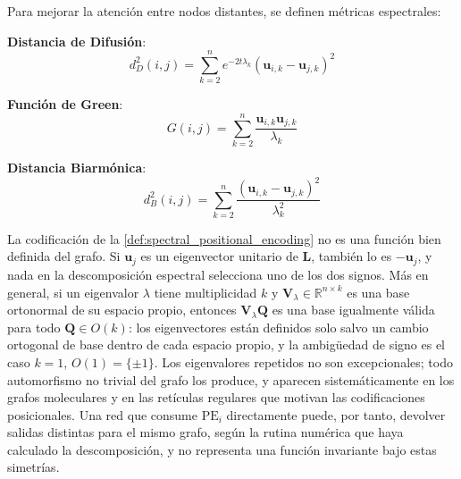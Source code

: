 \begin{definition}\label{def:spectral_distances_attention}
Para mejorar la atención entre nodos distantes, se definen métricas espectrales:

\textbf{Distancia de Difusión}:
\begin{equation}
    d_D^2(i,j) = \sum_{k=2}^{n} e^{-2t\lambda_k} (\mathbf{u}_{i,k} - \mathbf{u}_{j,k})^2
    \label{eq:diffusion_distance}
\end{equation}

\textbf{Función de Green}:
\begin{equation}
    G(i,j) = \sum_{k=2}^{n} \frac{\mathbf{u}_{i,k} \mathbf{u}_{j,k}}{\lambda_k}
    \label{eq:green_function_distance}
\end{equation}

\textbf{Distancia Biarmónica}:
\begin{equation}
    d_B^2(i,j) = \sum_{k=2}^{n} \frac{(\mathbf{u}_{i,k} - \mathbf{u}_{j,k})^2}{\lambda_k^2}
    \label{eq:biharmonic_distance}
\end{equation}
\end{definition}

\begin{remark}\label{rem:ambiguedad_autovectores}
La codificación de la \autoref{def:spectral_positional_encoding} no es una función bien definida del grafo. Si $\mathbf{u}_j$ es un eigenvector unitario de $\mathbf{L}$, también lo es $-\mathbf{u}_j$, y nada en la descomposición espectral selecciona uno de los dos signos. Más en general, si un eigenvalor $\lambda$ tiene multiplicidad $k$ y $\mathbf{V}_\lambda \in \mathbb{R}^{n \times k}$ es una base ortonormal de su espacio propio, entonces $\mathbf{V}_\lambda \mathbf{Q}$ es una base igualmente válida para todo $\mathbf{Q} \in O(k)$: los eigenvectores están definidos solo salvo un cambio ortogonal de base dentro de cada espacio propio, y la ambigüedad de signo es el caso $k = 1$, $O(1) = \{\pm 1\}$. Los eigenvalores repetidos no son excepcionales; todo automorfismo no trivial del grafo los produce, y aparecen sistemáticamente en los grafos moleculares y en las retículas regulares que motivan las codificaciones posicionales. Una red que consume $\text{PE}_i$ directamente puede, por tanto, devolver salidas distintas para el mismo grafo, según la rutina numérica que haya calculado la descomposición, y no representa una función invariante bajo estas simetrías.
\end{remark}

